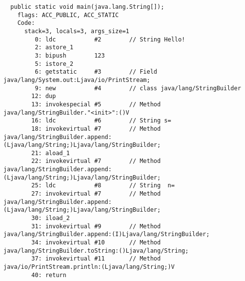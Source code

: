 
\begin{lstlisting}
  public static void main(java.lang.String[]);
    flags: ACC_PUBLIC, ACC_STATIC
    Code:
      stack=3, locals=3, args_size=1
         0: ldc           #2        // String Hello!
         2: astore_1      
         3: bipush        123
         5: istore_2      
         6: getstatic     #3        // Field java/lang/System.out:Ljava/io/PrintStream;
         9: new           #4        // class java/lang/StringBuilder
        12: dup           
        13: invokespecial #5        // Method java/lang/StringBuilder."<init>":()V
        16: ldc           #6        // String s=
        18: invokevirtual #7        // Method java/lang/StringBuilder.append:(Ljava/lang/String;)Ljava/lang/StringBuilder;
        21: aload_1       
        22: invokevirtual #7        // Method java/lang/StringBuilder.append:(Ljava/lang/String;)Ljava/lang/StringBuilder;
        25: ldc           #8        // String  n=
        27: invokevirtual #7        // Method java/lang/StringBuilder.append:(Ljava/lang/String;)Ljava/lang/StringBuilder;
        30: iload_2       
        31: invokevirtual #9        // Method java/lang/StringBuilder.append:(I)Ljava/lang/StringBuilder;
        34: invokevirtual #10       // Method java/lang/StringBuilder.toString:()Ljava/lang/String;
        37: invokevirtual #11       // Method java/io/PrintStream.println:(Ljava/lang/String;)V
        40: return        
\end{lstlisting}
